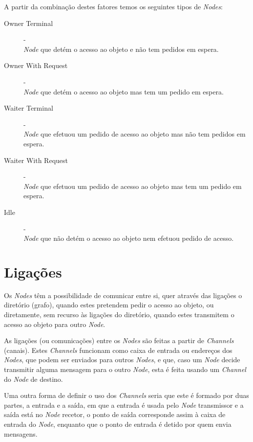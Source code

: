 A partir da combinação destes fatores temos os seguintes tipos de \emph{Nodes}:

\begin{description}
    \item [Owner Terminal] - \\ \emph{Node} que detém o acesso ao objeto e não tem pedidos em espera.
    \item [Owner With Request] - \\ \emph{Node} que detém o acesso ao objeto mas tem um pedido em espera.
    \item [Waiter Terminal] - \\ \emph{Node} que efetuou um pedido de acesso ao objeto mas não tem pedidos em espera.
    \item [Waiter With Request] - \\ \emph{Node} que efetuou um pedido de acesso ao objeto mas tem um pedido em espera.
    \item [Idle] - \\ \emph{Node} que não detém o acesso ao objeto nem efetuou pedido de acesso.
\end{description}



\section{Ligações}

Os \emph{Nodes} têm a possibilidade de comunicar entre si, quer através das ligações o diretório (grafo), quando estes pretendem pedir o acesso ao objeto, ou diretamente, sem recurso às ligações do diretório, quando estes transmitem o acesso ao objeto para outro \emph{Node}.

As ligações (ou comunicações) entre os \emph{Nodes} são feitas a partir de \emph{Channels} (canais). Estes \emph{Channels} funcionam como caixa de entrada ou endereços dos \emph{Nodes}, que podem ser enviados para outros \emph{Nodes}, e que, caso um \emph{Node} decide transmitir alguma mensagem para o outro \emph{Node}, esta é feita usando um \emph{Channel} do \emph{Node} de destino.

Uma outra forma de definir o uso dos \emph{Channels} seria que este é formado por duas partes, a entrada e a saída, em que a entrada é usada pelo \emph{Node} transmissor e a saída está no \emph{Node} recetor, o ponto de saída corresponde assim à caixa de entrada do \emph{Node}, enquanto que o ponto de entrada é detido por quem envia mensagens.

